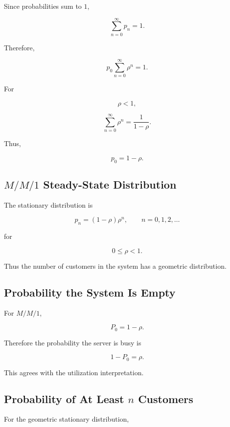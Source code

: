 Since probabilities sum to \(1\),

\[
\sum_{n=0}^{\infty}
p_n
=
1.
\]

Therefore,

\[
p_0
\sum_{n=0}^{\infty}
\rho^n
=
1.
\]

For

\[
\rho<1,
\]

\[
\sum_{n=0}^{\infty}
\rho^n
=
\frac1{1-\rho}.
\]

Thus,

\[
\boxed{
p_0
=
1-\rho.
}
\]

\subsection{\(M/M/1\) Steady-State Distribution}
\label{subsec:mm1-steady-state-distribution}

The stationary distribution is

\[
\boxed{
p_n
=
(1-\rho)\rho^n,
\qquad
n=0,1,2,\ldots
}
\]

for

\[
\boxed{
0\leq\rho<1.
}
\]

Thus the number of customers in the system has a geometric distribution.

\subsection{Probability the System Is Empty}
\label{subsec:mm1-empty}

For \(M/M/1\),

\[
\boxed{
P_0
=
1-\rho.
}
\]

Therefore the probability the server is busy is

\[
\boxed{
1-P_0
=
\rho.
}
\]

This agrees with the utilization interpretation.

\subsection{Probability of At Least \(n\) Customers}
\label{subsec:mm1-tail}

For the geometric stationary distribution,

